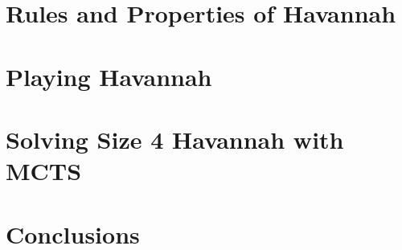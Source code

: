 \documentclass[12pt, letterpaper]{report}
\renewcommand{\baselinestretch}{1.33}
\numberwithin{equation}{section}
\begin{document}
  \chapter[Havannah]{\label{havannah} \LARGE Rules and Properties of Havannah}
  

  \chapter[Playing Havannah]{\label{playing} \LARGE Playing Havannah }
  

  \chapter[Solving Size 4 Havannah!]{\label{solving} \LARGE Solving Size 4 Havannah with MCTS}
  

  \chapter[Conclusions]{\label{conclusion} \LARGE Conclusions}
  
  
%    
  
  
  \small
  \renewcommand{\baselinestretch}{0.25}
  
\end{document}
